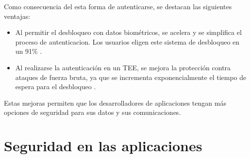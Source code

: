Como consecuencia del esta forma de autenticarse, se destacan las siguientes ventajas:
\begin{itemize}
    \item Al permitir el desbloqueo con datos biométricos, se acelera y se simplifica el proceso de autenticacion. Los usuarios eligen este sistema de desbloqueo en un 91\% \cite{asreview2015}.
    \item Al realizarse la autenticación en un TEE, se mejora la protección contra ataques de fuerza bruta, ya que se incrementa exponencialmente el tiempo de espera para el desbloqueo \cite{asreview2015}.
\end{itemize}
Estas mejoras permiten que los desarrolladores de aplicaciones tengan más opciones de seguridad para sus datos y sus comunicaciones.
\section{Seguridad en las aplicaciones}
